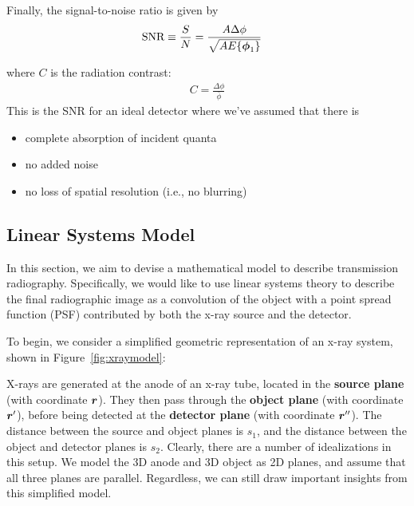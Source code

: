 \documentclass[mphy386-notes.tex]{subfiles}
\begin{document}
Finally, the signal-to-noise ratio is given by
 \begin{align}
   \text{SNR} &\equiv \frac{S}{N} = \frac{A\Delta\phi}{\sqrt{AE\{\boldsymbol{\phi}_1\}}}
 \end{align}   
 
where $C$ is the radiation contrast:
\begin{align}
  C = \frac{\Delta\phi}{\bar{\phi}}
\end{align}
This is the SNR for an ideal detector where we've assumed that there is
\begin{itemize}
\item complete absorption of incident quanta
\item no added noise
\item no loss of spatial resolution (i.e., no blurring)
\end{itemize}


\subsection{Linear Systems Model}

In this section, we aim to devise a mathematical model to
describe transmission radiography. Specifically, we would like to
use linear systems theory to describe the final radiographic
image as a convolution of the object with a point spread function (PSF)
contributed by both the x-ray source and the detector.

To begin, we consider a simplified geometric representation of an x-ray
system, shown in Figure~\ref{fig:xraymodel}:


X-rays are generated at the anode of an x-ray tube, located in the
\textbf{source plane} (with coordinate $\boldsymbol{r}$). They then pass through the
\textbf{object plane} (with coordinate $\boldsymbol{r}'$), before
being detected at the \textbf{detector plane} (with coordinate $\boldsymbol{r}''$).
The distance between the source and object planes is $s_1$, and the distance
between the object and detector planes is $s_2$. Clearly, there are a number
of idealizations in this setup. We model the 3D anode and 3D object as
2D planes, and assume that all three planes are parallel. Regardless,
we can still draw important insights from this simplified model.
\end{document}
